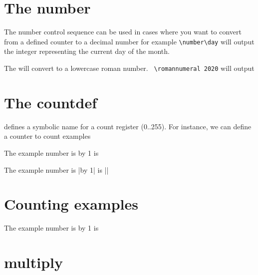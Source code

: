 \section{The number}

The number control sequence can be used in cases where you want to convert from a defined counter to
a decimal number for example \verb+\number\day+ will output the integer representing the current day of the month.
\number\day

The  will convert to a lowercase roman number. 
\verb+ \romannumeral 2020+  will output {\textit{}}


\section{The countdef}

 defines a symbolic name for a count register (0..255). For instance, we can define a counter
to count examples 
\begin{teX}
\countdef{}  %
The example number is \advance\examplenum by 1  is \number\examplenum
\countdef{}  %
\end{teX}

The example number is |\advance\examplenum by 1|  is |\number\examplenum|

\begin{teX}
\newcommand{\example}{%
   \noindent
    \textit{Example \number\examplenum\smallskip }%
   \advance\examplenum by 1%
 }
\end{teX}






\section{Counting examples}


\begin{teXXX}
\countdef{}  %
The example number is \advance\examplenum by 1  is \number\examplenum
\end{teXXX}




\section{multiply} 

